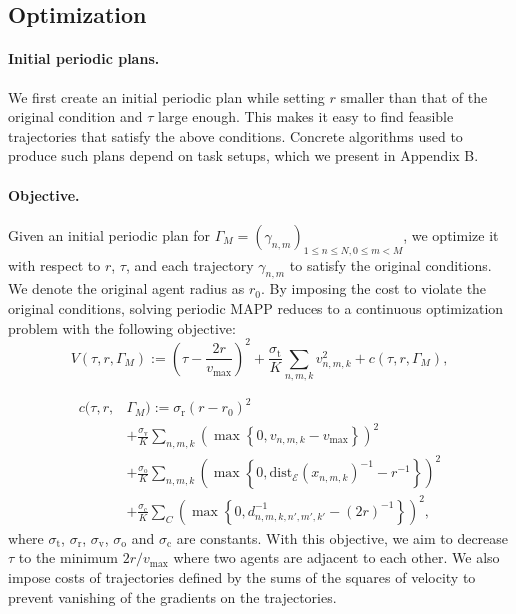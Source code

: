 \documentclass[letterpaper]{article} %
\begin{document}
\subsection{Optimization}
\paragraph{Initial periodic plans.}
We first create an initial periodic plan while setting $r$ smaller than that of the original condition and $\tau$ large enough. This makes it easy to find feasible trajectories that satisfy the above conditions. Concrete algorithms used to produce such plans depend on task setups, which we present in Appendix B.

\paragraph{Objective.}
Given an initial periodic plan for $\Gamma_M= (\gamma_{n,m})_{1\leq n\leq N, 0\leq m < M}$, we optimize it with respect to $r$, $\tau$, and each trajectory $\gamma_{n, m}$ to satisfy the original conditions. We denote the original agent radius as $r_0$. By imposing the cost to violate the original conditions, solving periodic MAPP reduces to a continuous optimization problem with the following objective:
\begin{equation}
V(\tau,r,\Gamma_M):= \left(\tau-\frac{2r}{v_{\mathrm{max}}}\right)^2+ \frac{\sigma_{\mathrm{t}}}{K} \sum_{n,m,k}v_{n,m,k}^2 + c(\tau, r,\Gamma_M),
\end{equation}

\begin{equation}
\begin{split}
 c(\tau, r,&\Gamma_M):=\sigma_{\mathrm{r}}(r-r_0)^2\\
&+ \frac{\sigma_{\mathrm{v}}}{K} \sum_{n,m,k}\left(\max\left\{0,v_{n,m,k}-v_{\mathrm{max}}\right\}\right)^2\\&+
 \frac{\sigma_{\mathrm{o}}}{K}\sum_{n,m,k}\left(\max\left\{0,\mathrm{dist}_{\mathcal{E}}(x_{n,m,k})^{-1}-r^{-1}\right\}\right)^2\\
&+\frac{\sigma_{\mathrm{c}}}{K}\sum_{C} \left(\max\left\{0,d_{n,m,k,n',m',k'}^{-1}-(2r)^{-1}\right\}\right)^{2},
\end{split}
\end{equation}
where $\sigma_{\mathrm{t}}$, $\sigma_{\mathrm{r}}$, $\sigma_{\mathrm{v}}$, $\sigma_{\mathrm{o}}$ and $\sigma_{\mathrm{c}}$ are constants.
With this objective, we aim to decrease $\tau$ to the minimum $2r/v_{\mathrm{max}}$ where two agents are adjacent to each other.
We also impose costs of trajectories defined by the sums of the squares of velocity to prevent vanishing of the gradients on the trajectories.
\end{document}
